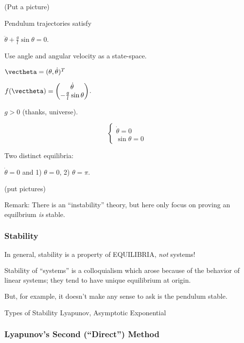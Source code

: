 \documentclass[12pt]{beamer}
\begin{document}
\begin{frame}

(Put a picture)

Pendulum trajectories satisfy

$\ddot\theta + \frac{g}{l} \sin \theta = 0$.

Use angle and angular velocity as a state-space.

$\vectheta = (\theta, \dot \theta)^T$

$f(\vectheta)
	= \begin{pmatrix}
		\dot\theta \\
		-\frac{g}{l} \sin\theta
	\end{pmatrix}$.
	
$g > 0$ (thanks, universe).

\[
\begin{cases}
\dot\theta = 0 \\
\sin \theta = 0
\end{cases}
\]

Two distinct equilibria:

$\dot\theta = 0$ and 1) $\theta=0$, 2) $\theta=\pi$.

(put pictures)

Remark: There is an ``instability'' theory, but here only focus on proving an equilbrium \emph{is} stable.

\end{frame}



\begin{frame}
\frametitle{Stability}

In general, stability is a property of EQUILIBRIA, \emph{not} systems!

Stability of ``systems'' is a colloquialism which arose because of the behavior of linear systems;
they tend to have unique equilibrium at origin.

But, for example, it doesn't make any sense to ask is the pendulum stable.

\begin{block}{Types of Stability}
Lyapunov,
Asymptotic
Exponential
\end{block}

\end{frame}




\begin{frame}
\frametitle{Lyapunov's Second (``Direct'') Method}
\end{frame}
\end{document}
